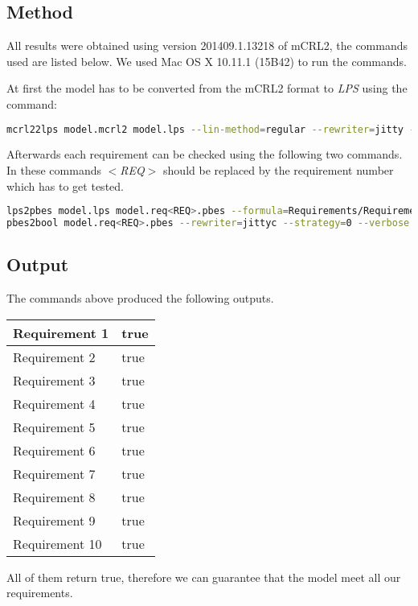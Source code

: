 \cbstart


\subsection{Method}
All results were obtained using version 201409.1.13218 of mCRL2, the commands used are listed below. We used Mac OS X 10.11.1 (15B42) to run the commands.

At first the model has to be converted from the mCRL2 format to \emph{LPS} using the command:
\begin{lstlisting}[language=bash]
mcrl22lps model.mcrl2 model.lps --lin-method=regular --rewriter=jitty --verbose
\end{lstlisting}

Afterwards each requirement can be checked using the following two commands. In these commands \emph{$<$REQ$>$} should be replaced by the requirement number which has to get tested.

\begin{lstlisting}[language=bash]
lps2pbes model.lps model.req<REQ>.pbes --formula=Requirements/Requirement<REQ>.mcf --verbose
pbes2bool model.req<REQ>.pbes --rewriter=jittyc --strategy=0 --verbose
\end{lstlisting}

\subsection{Output}

The commands above produced the following outputs.


\begin{tabular}{|l|l|}
\hline
Requirement 1 & true \\
\hline
Requirement 2 & true \\
\hline
Requirement 3 & true \\
\hline
Requirement 4 & true \\
\hline
Requirement 5 & true \\
\hline
Requirement 6 & true \\
\hline
Requirement 7 & true \\
\hline
Requirement 8 & true \\
\hline
Requirement 9 & true \\
\hline
Requirement 10 & true \\
\hline
\end{tabular}


All of them return true, therefore we can guarantee that the model meet all our requirements.

\cbend